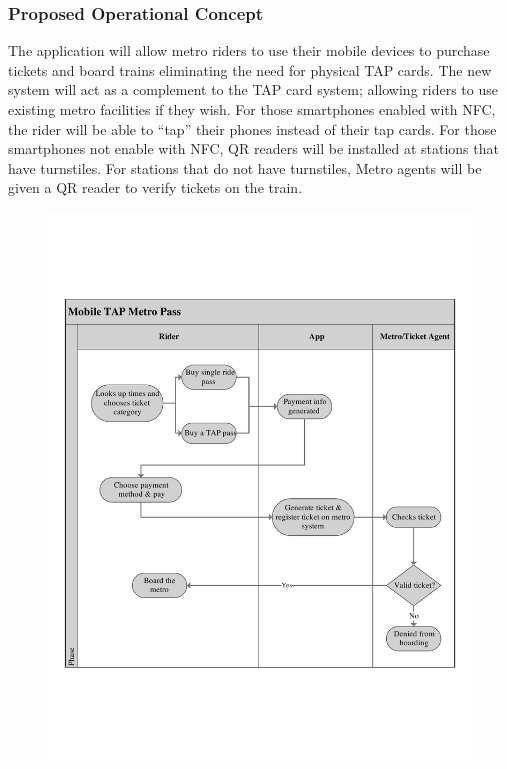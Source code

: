 	\subsubsection{Proposed Operational Concept}
		The application will allow metro riders to use their mobile devices to purchase tickets and board trains eliminating the need for physical TAP cards. The new system will act as a complement to the TAP card system; allowing riders to use existing metro facilities if they wish. For those smartphones enabled with NFC, the rider will be able to “tap” their phones instead of their tap cards. For those smartphones not enable with NFC, QR readers will be installed at stations that have turnstiles. For stations that do not have turnstiles, Metro agents will be given a QR reader to verify tickets on the train.
		\begin{figure}[h]
			\centering
			\includegraphics[scale=.355]{OCD/uml.pdf}
		\end{figure}